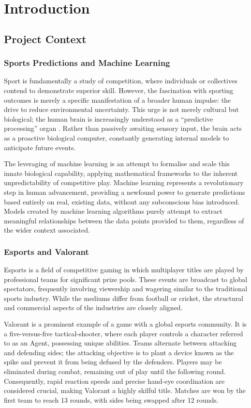 \chapter{Introduction}
\section{Project Context}
\subsection{Sports Predictions and Machine Learning}
Sport is fundamentally a study of competition, where individuals or collectives contend to demonstrate superior skill. However, the fascination with sporting outcomes is merely a specific manifestation of a broader human impulse: the drive to reduce environmental uncertainty. This urge is not merely cultural but biological; the human brain is increasingly understood as a ``predictive processing'' organ \cite{prediction_brain}. Rather than passively awaiting sensory input, the brain acts as a proactive biological computer, constantly generating internal models to anticipate future events.

The leveraging of machine learning is an attempt to formalise and scale this innate biological capability, applying mathematical frameworks to the inherent unpredictability of competitive play. Machine learning represents a revolutionary step in human advancement, providing a newfound power to generate predictions based entirely on real, existing data, without any subconscious bias introduced. Models created by machine learning algorithms purely attempt to extract meaningful relationships between the data points provided to them, regardless of the wider context associated.

\subsection{Esports and Valorant}
Esports is a field of competitive gaming in which multiplayer titles are played by professional teams for significant prize pools. These events are broadcast to global spectators, frequently involving viewership and wagering similar to the traditional sports industry. While the mediums differ from football or cricket, the structural and commercial aspects of the industries are closely aligned.

Valorant is a prominent example of a game with a global esports community. It is a five-versus-five tactical-shooter, where each player controls a character referred to as an Agent, possessing unique abilities. Teams alternate between attacking and defending sides; the attacking objective is to plant a device known as the spike and prevent it from being defused by the defenders. Players may be eliminated during combat, remaining out of play until the following round. Consequently, rapid reaction speeds and precise hand-eye coordination are considered crucial, making Valorant a highly skilful title. Matches are won by the first team to reach 13 rounds, with sides being swapped after 12 rounds.

